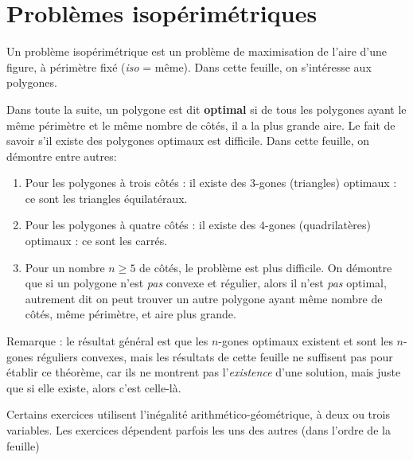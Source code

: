 

\chapter{Problèmes isopérimétriques}


Un problème isopérimétrique est un problème de maximisation de l'aire d'une figure, à périmètre fixé (\emph{iso} = même). Dans cette feuille, on s'intéresse aux polygones.

Dans toute la suite, un polygone est dit \textbf{optimal} si de tous les polygones ayant le même périmètre et le même nombre de côtés, il a la plus grande aire. Le fait de savoir s'il existe des polygones optimaux est difficile. Dans cette feuille, on démontre entre autres:
\begin{enumerate}
\item Pour les polygones à trois côtés : il existe des $3$-gones (triangles) optimaux : ce sont les triangles équilatéraux.
\item Pour les polygones à quatre côtés : il existe des $4$-gones (quadrilatères) optimaux : ce sont les carrés.
\item Pour un nombre $n\geq 5$ de côtés, le problème est plus difficile. On démontre que si un polygone n'est \emph{pas} convexe et régulier, alors il n'est \emph{pas} optimal, autrement dit on peut trouver un autre polygone ayant même nombre de côtés, même périmètre, et aire plus grande. 
\end{enumerate}

Remarque : le résultat général est que les $n$-gones optimaux existent et sont les $n$-gones réguliers convexes, mais les résultats de cette feuille ne suffisent pas pour établir ce théorème, car ils ne montrent pas l'\emph{existence} d'une solution, mais juste que si elle existe, alors c'est celle-là.


Certains exercices utilisent l'inégalité arithmético-géométrique, à deux ou trois variables. Les exercices dépendent parfois les uns des autres (dans l'ordre de la feuille)

